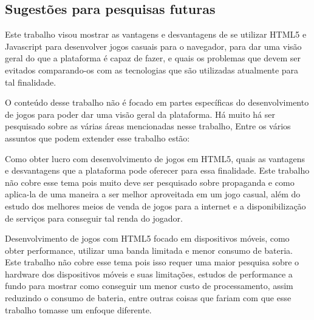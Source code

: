 \subsection{Sugestões para pesquisas futuras}

Este trabalho visou mostrar as vantagens e desvantagens de se utilizar
HTML5 e Javascript para desenvolver jogos casuais para o navegador,
para dar uma visão geral do que a plataforma é capaz de fazer, e quais
os problemas que devem ser evitados comparando-os com as tecnologias
que são utilizadas atualmente para tal finalidade.

O conteúdo desse trabalho não é focado em partes específicas do
desenvolvimento de jogos para poder dar uma visão geral da plataforma.
Há muito há ser pesquisado sobre as várias áreas mencionadas nesse
trabalho, Entre os vários assuntos que podem extender esse trabalho
estão:

Como obter lucro com desenvolvimento de jogos em HTML5, quais as vantagens
e desvantagens que a plataforma pode oferecer para essa
finalidade. Este trabalho não cobre esse tema pois muito deve ser
pesquisado sobre propaganda e como aplica-la de uma maneira a ser
melhor aproveitada em um jogo casual, além do estudo dos melhores
meios de venda de jogos para a internet e a disponibilização de
serviços para conseguir tal renda do jogador.

Desenvolvimento de jogos com HTML5 focado em dispositivos móveis, como
obter performance, utilizar uma banda limitada e menor consumo de
bateria. Este trabalho não cobre esse tema pois isso requer uma maior
pesquisa sobre o hardware dos dispositivos móveis e suas limitações,
estudos de performance a fundo para mostrar como conseguir um menor
custo de processamento, assim reduzindo o consumo de bateria, entre
outras coisas que fariam com que esse trabalho tomasse um enfoque
diferente.
